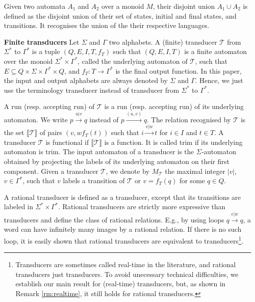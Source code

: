 \documentclass[envcountsame]{llncs}
\newcommand\inter[1]{\llbracket #1 \rrbracket}
\newcommand\tra{\mathcal{T}}
\begin{document}
Given two automata $A_1$ and $A_2$ over a monoid $M$, their disjoint
union $A_1\cup A_2$ is defined as the disjoint union of their set of states, initial and final states,
and transitions. It recognises the union of the their respective
languages. 

\vspace{2mm}
\noindent \textbf{Finite transducers} Let $\Sigma$ and $\Gamma$ two
alphabets. A (finite)
transducer $\mathcal{T}$ from $\Sigma^*$ to $\Gamma^*$ is a tuple
$(Q,E,I,T,f_T)$ such that $(Q,E,I,T)$ is a
finite automaton over the monoid $\Sigma^*\times \Gamma^*$, called the underlying automaton of $\mathcal{T}$,
such that $E\subseteq Q\times \Sigma\times \Gamma^*\times Q$, 
and $f_T :  T \rightarrow \Gamma^*$ is the final output
function. In this paper, the input and output alphabets are always denoted by
$\Sigma$ and $\Gamma$. Hence, we just
use the terminology transducer instead of transducer from $\Sigma^*$
to $\Gamma^*$. 



A run (resp. accepting run) of $\tra$ is a run (resp. accepting run)
of its underlying automaton. We write $p\xrightarrow{u|v} q$ instead
of $p\xrightarrow{(u,v)} q$. The relation recognised by $\tra$ is the
set $\inter{\tra}$ of pairs $(v,wf_T(t))$ such that $i
\xrightarrow{v|w} t$ for $i\in I$ and $t\in T$. A transducer $\tra$ is functional if $\inter{\tra}$ is a function. It is called trim if its underlying automaton is trim.
The input automaton of a transducer is the $\Sigma$-automaton obtained by projecting the labels of its underlying automaton on their first component.
Given a transducer $\mathcal{T}$, we denote by $M_{\mathcal{T}}$ the
maximal integer $|v|$, $v\in \Gamma^*$, such that $v$ labels a
transition of $\tra$ or $v = f_T(q)$ for some $q\in Q$. 

A rational transducer is defined as a transducer, except that its
transitions are labeled in $\Sigma^*\times \Gamma^*$. Rational
transducers are strictly more expressive than transducers and define
the class of rational relations. E.g., by using loops 
$q\xrightarrow{\epsilon|w} q$, a word can have infinitely many images
by a rational relation. If there is no such loop, it is
easily shown that rational transducers are equivalent to transducers\footnote{Transducers are sometimes called real-time in the
  literature, and rational transducers just transducers. To avoid
  unecessary technical difficulties, we establish our main result for 
  (real-time) transducers, but, as shown in Remark \ref{rm:realtime},
  it still holds for rational transducers.}. 
\end{document}

